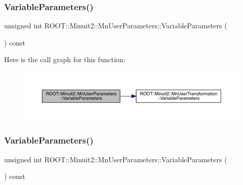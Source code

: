 \subsubsection{\texorpdfstring{VariableParameters()}{VariableParameters()}\hspace{0.1cm}{\footnotesize\ttfamily [2/3]}}
{\footnotesize\ttfamily unsigned int R\+O\+O\+T\+::\+Minuit2\+::\+Mn\+User\+Parameters\+::\+Variable\+Parameters (\begin{DoxyParamCaption}{ }\end{DoxyParamCaption}) const\hspace{0.3cm}{\ttfamily [inline]}}

Here is the call graph for this function\+:
\nopagebreak
\begin{figure}[H]
\begin{center}
\leavevmode
\includegraphics[width=350pt]{d6/d10/classROOT_1_1Minuit2_1_1MnUserParameters_af19ee84626fbdeb819e6a86e82794f19_cgraph}
\end{center}
\end{figure}
\mbox{\label{classROOT_1_1Minuit2_1_1MnUserParameters_af19ee84626fbdeb819e6a86e82794f19}} 
\subsubsection{\texorpdfstring{VariableParameters()}{VariableParameters()}\hspace{0.1cm}{\footnotesize\ttfamily [3/3]}}
{\footnotesize\ttfamily unsigned int R\+O\+O\+T\+::\+Minuit2\+::\+Mn\+User\+Parameters\+::\+Variable\+Parameters (\begin{DoxyParamCaption}{ }\end{DoxyParamCaption}) const\hspace{0.3cm}{\ttfamily [inline]}}


